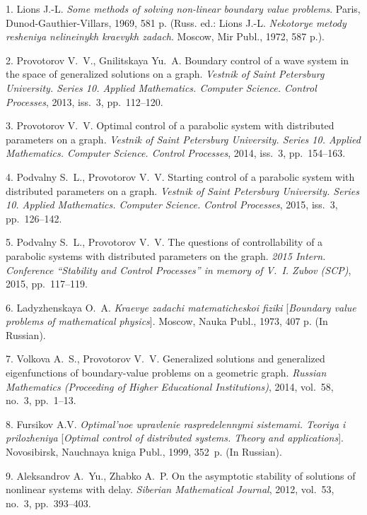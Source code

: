 

{\footnotesize

\vskip 4mm


\vskip 3mm

1. Lions J.-L. \textit{Some methods of solving non-linear boundary
value problems}. Paris, Dunod-Gauthier-Villars, 1969, 581 p.
(Russ. ed.: Lions J.-L. \textit{Nekotorye metody resheniya
nelineinykh kraevykh zadach}. Moscow, Mir Publ., 1972, 587 p.).

2. Provotorov V.~V., Gnilitskaya Yu.~A. Boundary control of a wave
system in the space of generalized solutions on a graph.
\textit{Vestnik of Saint Petersburg University. Series 10. Applied
Mathematics. Computer Science. Control Processes}, 2013, iss.~3,
pp.~112--120.

3. Provotorov V.~V. Optimal control of a parabolic system with
distributed parameters on a graph. \textit{Vestnik of Saint
Petersburg University. Series 10. Applied Mathematics. Computer
Science. Control Processes}, 2014, iss.~3, pp.~154--163.

4. Podvalny S.~L., Provotorov V.~V. Starting control of a
parabolic system with distributed parameters on a graph.
\textit{Vestnik of Saint Petersburg University. Series 10. Applied
Mathematics. Computer Science. Control Processes}, 2015, iss.~3,
pp.~126--142.

5. Podvalny S.~L., Provotorov V.~V. The questions of
controllability of a parabolic systems with distributed parameters
on the graph. \textit{2015 Intern. Conference ``Stability and
Control Processes'' in memory of V.~I. Zubov (SCP)}, 2015,
pp.~117--119.

6. Ladyzhenskaya O.~A. \textit{Kraevye zadachi matematicheskoi
fiziki} [\textit{Boundary value problems of mathematical
physics}]. Moscow, Nauka Publ., 1973, 407 p. (In Russian).

7. Volkova A.~S., Provotorov V.~V. Generalized solutions and
generalized eigenfunctions of boundary-value problems on a
geometric graph. \textit{Russian Mathematics (Proceeding of Higher
Educational Institutions)}, 2014, vol.~58, no.~3, pp.~1--13.

8. Fursikov A.V. \textit{Optimal'noe upravlenie raspredelennymi
sistemami. Teoriya i prilozheniya} [\textit{Optimal control of
distributed systems. Theory and applications}]. Novosibirsk,
Nauchnaya kniga Publ., 1999, 352~p. (In Russian).

9. Aleksandrov A.~Yu., Zhabko A.~P. On the asymptotic stability of
solutions of nonlinear systems with delay. \textit{Siberian
Mathematical Journal}, 2012, vol.~53, no.~3, pp.~393--403.

}
